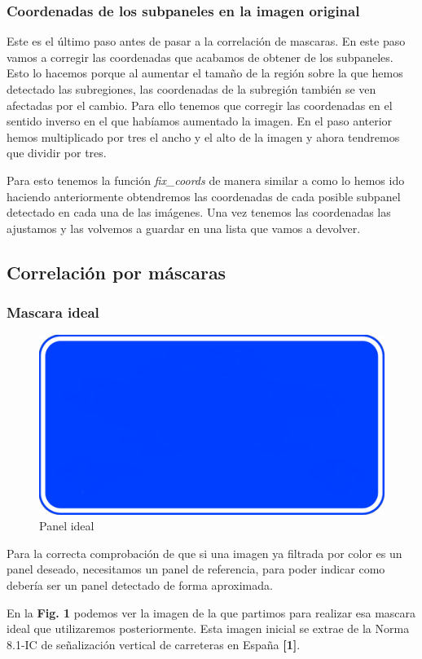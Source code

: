 \documentclass[a4paper, 12pt]{article}
\begin{document}
\subsubsection{Coordenadas de los subpaneles en la imagen original}
Este es el último paso antes de pasar a la correlación de mascaras. En este paso vamos a corregir las coordenadas que acabamos de obtener de los subpaneles. Esto lo hacemos porque al aumentar el tamaño de la región sobre la que hemos detectado las subregiones, las coordenadas de la subregión también se ven afectadas por el cambio. Para ello tenemos que corregir las coordenadas en el sentido inverso en el que habíamos aumentado la imagen. En el paso anterior hemos multiplicado por tres el ancho y el alto de la imagen y ahora tendremos que dividir por tres. 

Para esto tenemos la función \textit{fix\_coords} de manera similar a como lo hemos ido haciendo anteriormente obtendremos las coordenadas de cada posible subpanel detectado en cada una de las imágenes. Una vez tenemos las coordenadas las ajustamos y las volvemos a guardar en una lista que vamos a devolver. 



\subsection{Correlación por máscaras}
\subsubsection{Mascara ideal}

\begin{figure}[h]
	\centering
	\includegraphics[width=0.4\linewidth]{img/ideal_mask}
	\caption{Panel ideal}
	\label{fig:idealmask}
\end{figure}

Para la correcta comprobación de que si una imagen ya filtrada por color es un panel deseado, necesitamos un panel de referencia, para poder indicar como debería ser un panel detectado de forma aproximada.


En la \textbf{Fig. 1} podemos ver la imagen de la que partimos para realizar esa mascara ideal que utilizaremos posteriormente. Esta imagen inicial se extrae de la Norma 8.1-IC de señalización vertical de carreteras en España \textbf{[1]}.
\end{document}
